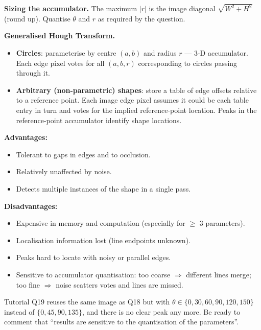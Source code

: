 \textbf{Sizing the accumulator.} The maximum $|r|$ is the image diagonal $\sqrt{W^2 + H^2}$ (round up). Quantise $\theta$ and $r$ as required by the question.

\separator

\textbf{Generalised Hough Transform.}
\begin{itemize}
  \item \textbf{Circles}: parameterise by centre $(a, b)$ and radius $r$ --- 3-D accumulator. Each edge pixel votes for all $(a, b, r)$ corresponding to circles passing through it.
  \item \textbf{Arbitrary (non-parametric) shapes}: store a table of edge offsets relative to a reference point. Each image edge pixel assumes it could be each table entry in turn and votes for the implied reference-point location. Peaks in the reference-point accumulator identify shape locations.
\end{itemize}

\separator

\begin{thmbox}
\textbf{Advantages:}
\begin{itemize}
  \item Tolerant to gaps in edges and to occlusion.
  \item Relatively unaffected by noise.
  \item Detects multiple instances of the shape in a single pass.
\end{itemize}
\textbf{Disadvantages:}
\begin{itemize}
  \item Expensive in memory and computation (especially for $\geq$ 3 parameters).
  \item Localisation information lost (line endpoints unknown).
  \item Peaks hard to locate with noisy or parallel edges.
  \item Sensitive to accumulator quantisation: too coarse $\Rightarrow$ different lines merge; too fine $\Rightarrow$ noise scatters votes and lines are missed.
\end{itemize}
\end{thmbox}

\begin{tipbox}
Tutorial Q19 reuses the same image as Q18 but with $\theta \in \{0, 30, 60, 90, 120, 150\}$ instead of $\{0, 45, 90, 135\}$, and there is no clear peak any more. Be ready to comment that ``results are sensitive to the quantisation of the parameters''.
\end{tipbox}

